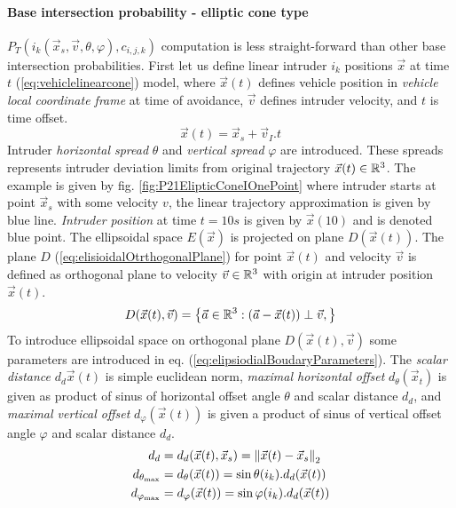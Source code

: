 \paragraph{Base intersection probability - elliptic cone type} $P_T(i_k(\vec{x}_s,\vec{v},\theta,\varphi),c_{i,j,k})$
computation is less straight-forward than other base intersection probabilities. First let us define linear intruder $i_k$ positions $\vec{x}$ at time $t$ (\ref{eq:vehiclelinearcone}) model, where $\vec{x}(t)$ defines vehicle position in \emph{vehicle local coordinate frame} at time of avoidance, $\vec{v}$ defines intruder velocity, and $t$ is time offset.
\begin{equation}\label{eq:vehiclelinearcone}
    \vec{x}(t)=\vec{x}_s + \vec{v}_I.t
\end{equation}
\noindent Intruder \emph{horizontal spread} $\theta$ and \emph{vertical spread} $\varphi$ are introduced. These spreads represents intruder deviation limits from original trajectory $\vec{x}(t)\in\mathbb{R}^3$. The example is given by fig. \ref{fig:P21ElipticConeIOnePoint} where intruder starts at point $\vec{x}_s$ with some velocity $v$, the linear trajectory approximation is given by blue line. \emph{Intruder position} at time $t=10s$ is given by $\vec{x}(10)$ and is denoted blue point. The ellipsoidal space $E(\vec{x})$ is projected on plane $D(\vec{x}(t))$. The plane $D$ (\ref{eq:elisioidalOtrthogonalPlane}) for point $\vec{x}(t)$ and velocity $\vec{v}$ is defined as orthogonal plane to velocity $\vec{v}\in\mathbb{R}^3$ with origin at intruder position $\vec{x}(t)$. 
\begin{equation}\label{eq:elisioidalOtrthogonalPlane}
    D(\vec{x}(t),\vec{v})=\left\{\vec{a}\in\mathbb{R}^3:(\vec{a}-\vec{x}(t))\perp\vec{v},\right\}
\end{equation}
\noindent To introduce ellipsoidal space on orthogonal plane $D(\vec{x}(t),\vec{v})$ some parameters are introduced in eq. (\ref{eq:elipsiodialBoudaryParameters}). The \emph{scalar distance} $d_d{\vec{x}(t)}$ is simple euclidean norm, \emph{maximal horizontal offset} $d_\theta(\vec{x}_t)$ is given as product of sinus of horizontal offset angle $\theta$ and scalar distance $d_d$, and \emph{maximal vertical offset} $d_\varphi(\vec{x}(t))$ is given a product of sinus of vertical offset angle $\varphi$ and scalar distance $d_d$.
\begin{equation}\label{eq:elipsiodialBoudaryParameters}
    \begin{aligned}
     d_d                      &=d_d(\vec{x}(t),\vec{x}_s) =\left\lVert\vec{x}(t)-\vec{x}_s\right\rVert_2\\ 
     d_{\theta_{\text{max}}}  &= d_\theta(\vec{x}(t))=\sin\theta   (i_k).d_d(\vec{x}(t))\\
     d_{\varphi_{\text{max}}} &= d_\varphi(\vec{x}(t))=\sin\varphi (i_k).d_d(\vec{x}(t)) 
    \end{aligned}
\end{equation}
